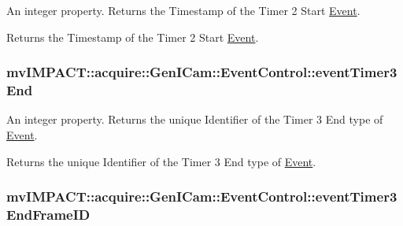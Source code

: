 An integer property. Returns the Timestamp of the Timer 2 Start \hyperlink{classmv_i_m_p_a_c_t_1_1acquire_1_1_event}{Event}. 

Returns the Timestamp of the Timer 2 Start \hyperlink{classmv_i_m_p_a_c_t_1_1acquire_1_1_event}{Event}. \hypertarget{classmv_i_m_p_a_c_t_1_1acquire_1_1_gen_i_cam_1_1_event_control_a69e279c62085a05dd42a394fed8bfd5a}{
\subsubsection[{event\+Timer3\+End}]{ mv\+I\+M\+P\+A\+C\+T\+::acquire\+::\+Gen\+I\+Cam\+::\+Event\+Control\+::event\+Timer3\+End}}\label{classmv_i_m_p_a_c_t_1_1acquire_1_1_gen_i_cam_1_1_event_control_a69e279c62085a05dd42a394fed8bfd5a}


An integer property. Returns the unique Identifier of the Timer 3 End type of \hyperlink{classmv_i_m_p_a_c_t_1_1acquire_1_1_event}{Event}. 

Returns the unique Identifier of the Timer 3 End type of \hyperlink{classmv_i_m_p_a_c_t_1_1acquire_1_1_event}{Event}. \hypertarget{classmv_i_m_p_a_c_t_1_1acquire_1_1_gen_i_cam_1_1_event_control_aeee2694df0f2197fdf167edac768b60d}{
\subsubsection[{event\+Timer3\+End\+Frame\+I\+D}]{ mv\+I\+M\+P\+A\+C\+T\+::acquire\+::\+Gen\+I\+Cam\+::\+Event\+Control\+::event\+Timer3\+End\+Frame\+I\+D}}\label{classmv_i_m_p_a_c_t_1_1acquire_1_1_gen_i_cam_1_1_event_control_aeee2694df0f2197fdf167edac768b60d}


